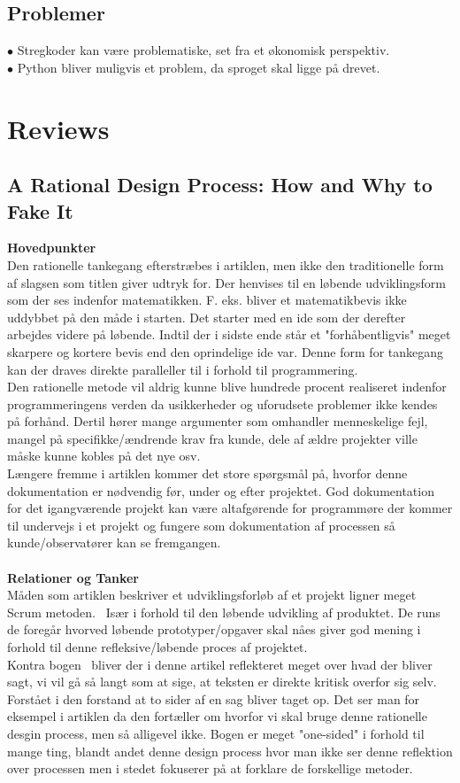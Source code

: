 \documentclass[a4paper]{article}
\begin{document}
\subsection*{Problemer}
$\bullet$ Stregkoder kan være problematiske, set fra et økonomisk perspektiv. \\
$\bullet$ Python bliver muligvis et problem, da sproget skal ligge på drevet.
\newpage
\section{Reviews}
\subsection{A Rational Design Process: How and Why to Fake It}
\textbf{Hovedpunkter}\\
Den rationelle tankegang efterstræbes i artiklen, men ikke den traditionelle form af slagsen som titlen giver udtryk for.
Der henvises til en løbende udviklingsform som der ses indenfor matematikken.
F. eks. bliver et matematikbevis ikke uddybbet på den måde i starten. Det starter med en ide som der derefter arbejdes videre på løbende. Indtil der i sidste ende står et "forhåbentligvis" meget skarpere og kortere bevis end den oprindelige ide var.
Denne form for tankegang kan der draves direkte paralleller til i forhold til programmering.\\
Den rationelle metode vil aldrig kunne blive hundrede procent realiseret indenfor programmeringens verden da usikkerheder og uforudsete problemer ikke kendes på forhånd. Dertil hører mange argumenter som omhandler menneskelige fejl, mangel på specifikke/ændrende krav fra kunde, dele af ældre projekter ville måske kunne kobles på det nye osv.\\
Længere fremme i artiklen kommer det store spørgsmål på, hvorfor denne dokumentation er nødvendig før, under og efter projektet. God dokumentation for det igangværende projekt kan være altafgørende for programmøre der kommer til undervejs i et projekt og fungere som dokumentation af processen så kunde/observatører kan se fremgangen.\\\\
\textbf{Relationer og Tanker}\\
Måden som artiklen beskriver et udviklingsforløb af et projekt ligner meget Scrum metoden.~\cite{Scrum} Især i forhold til den løbende udvikling af produktet. De runs de foregår hvorved løbende prototyper/opgaver skal nåes giver god mening i forhold til denne refleksive/løbende proces af projektet.\\
Kontra bogen~\cite{OOSE} bliver der i denne artikel reflekteret meget over hvad der bliver sagt, vi vil gå så langt som at sige, at teksten er direkte kritisk overfor sig selv. Forstået i den forstand at to sider af en sag bliver taget op. Det ser man for eksempel i artiklen da den fortæller om hvorfor vi skal bruge denne rationelle desgin process, men så alligevel ikke. Bogen er meget "one-sided" i forhold til mange ting, blandt andet denne design process hvor man ikke ser denne reflektion over processen men i stedet fokuserer på at forklare de forskellige metoder.\\
\pagebreak
\end{document}
